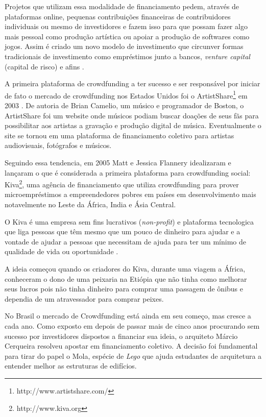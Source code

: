 Projetos que utilizam essa modalidade de financiamento pedem, através de plataformas online, pequenas contribuições financeiras de contribuidores individuais ou mesmo de investidores e fazem isso para que possam fazer algo mais pessoal como produção artística ou apoiar a produção de softwares como jogos. Assim é criado um novo modelo de investimento que circunver formas tradicionais de investimento como empréstimos junto a bancos, \emph{venture capital} (capital de risco) e afins \cite{belleflamme2010}.

A primeira plataforma de crowdfunding a ter sucesso e ser responsável por iniciar de fato o mercado de crowdfunding nos Estados Unidos foi o ArtistShare\footnote{http://www.artistshare.com/} em 2003 \cite{freedman2015brief}. De autoria de Brian Camelio, um músico e programador de Boston, o ArtistShare foi um website onde músicos podiam buscar doações de seus fãs para possibilitar aos artistas a gravação e produção digital de música. Eventualmente o site se tornou em uma plataforma de financiamento coletivo para artistas audiovisuais, fotógrafos e músicos.

Seguindo essa tendencia, em 2005 Matt e Jessica Flannery idealizaram e lançaram o que é considerada a primeira plataforma para crowdfunding social: Kiva\footnote{http://www.kiva.org}, uma agência de financiamento que utiliza crowdfunding para prover microempréstimos a empreendedores pobres em países em desenvolvimento mais notavelmente no Leste da África, India e Ásia Central.

O Kiva é uma empresa sem fins lucrativos (\emph{non-profit}) e plataforma tecnologica que liga pessoas que têm mesmo que um pouco de dinheiro para ajudar e a vontade de ajudar a pessoas que necessitam de ajuda para ter um mínimo de qualidade de vida ou oportunidade \cite{flannery2007kiva}.

A ideia começou quando os criadores do Kiva, durante uma viagem a África, conheceram o dono de uma peixaria na Etiópia que não tinha como melhorar seus lucros pois não tinha dinheiro para comprar uma passagem de ônibus e dependia de um atravessador para comprar peixes.

No Brasil o mercado de Crowdfunding está ainda em seu começo, mas cresce a cada ano. Como exposto em  \cite{globo-financiamento} depois de passar mais de cinco anos procurando sem sucesso por investidores dispostos a financiar sua ideia, o arquiteto Márcio Cerqueira resolveu apostar em financiamento coletivo. A decisão foi fundamental para tirar do papel o Mola, espécie de \emph{Lego} que ajuda estudantes de arquitetura a entender melhor as estruturas de edifícios.

